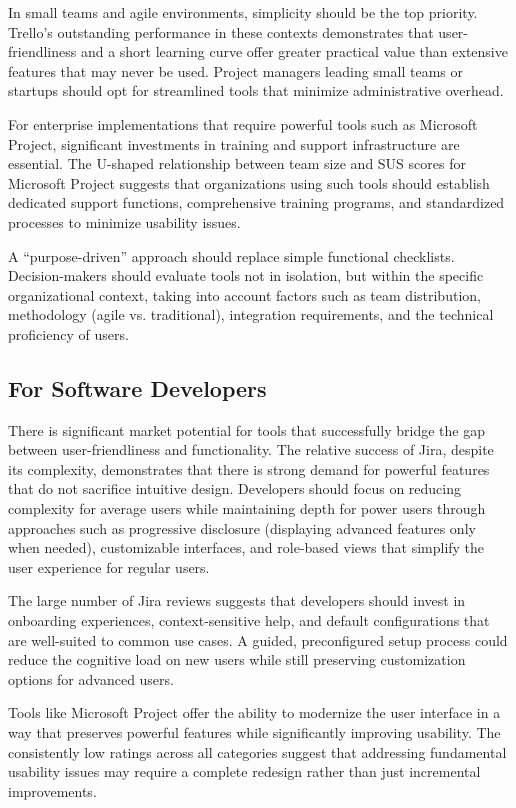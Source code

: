\documentclass[runningheads]{llncs}
\begin{document}
In small teams and agile environments, simplicity should be the top priority. Trello’s outstanding performance in these contexts demonstrates that user-friendliness and a short learning curve offer greater practical value than extensive features that may never be used. Project managers leading small teams or startups should opt for streamlined tools that minimize administrative overhead.


For enterprise implementations that require powerful tools such as Microsoft Project, significant investments in training and support infrastructure are essential. The U-shaped relationship between team size and SUS scores for Microsoft Project suggests that organizations using such tools should establish dedicated support functions, comprehensive training programs, and standardized processes to minimize usability issues.

A “purpose-driven” approach should replace simple functional checklists. Decision-makers should evaluate tools not in isolation, but within the specific organizational context, taking into account factors such as team distribution, methodology (agile vs. traditional), integration requirements, and the technical proficiency of users.

\subsection{For Software Developers}
There is significant market potential for tools that successfully bridge the gap between user-friendliness and functionality. The relative success of Jira, despite its complexity, demonstrates that there is strong demand for powerful features that do not sacrifice intuitive design. Developers should focus on reducing complexity for average users while maintaining depth for power users through approaches such as progressive disclosure (displaying advanced features only when needed), customizable interfaces, and role-based views that simplify the user experience for regular users.

The large number of Jira reviews suggests that developers should invest in onboarding experiences, context-sensitive help, and default configurations that are well-suited to common use cases. A guided, preconfigured setup process could reduce the cognitive load on new users while still preserving customization options for advanced users.

Tools like Microsoft Project offer the ability to modernize the user interface in a way that preserves powerful features while significantly improving usability. The consistently low ratings across all categories suggest that addressing fundamental usability issues may require a complete redesign rather than just incremental improvements.
\end{document}

